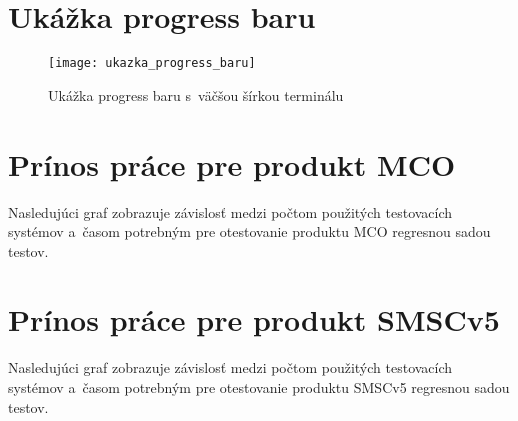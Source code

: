 %
%
\chapter{Ukážka progress baru}
\label{priloha:ukazka_progress_baru}
\begin{figure}[h]
  \begin{center}
    \texttt{[image: ukazka\_progress\_baru]}
    \caption{Ukážka progress baru s~väčšou šírkou terminálu}
  \end{center}
\end{figure}



%
%
\chapter{Prínos práce pre produkt MCO}
\label{priloha:graf_mco}
Nasledujúci graf zobrazuje závislosť medzi počtom použitých testovacích
systémov a~časom potrebným pre otestovanie produktu MCO regresnou sadou testov.

\begin{figure}[h!]
\end{figure}



%
%
\chapter{Prínos práce pre produkt SMSCv5}
\label{priloha:graf_smsc}
Nasledujúci graf zobrazuje závislosť medzi počtom použitých testovacích
systémov a~časom potrebným pre otestovanie produktu SMSCv5 regresnou sadou testov.

